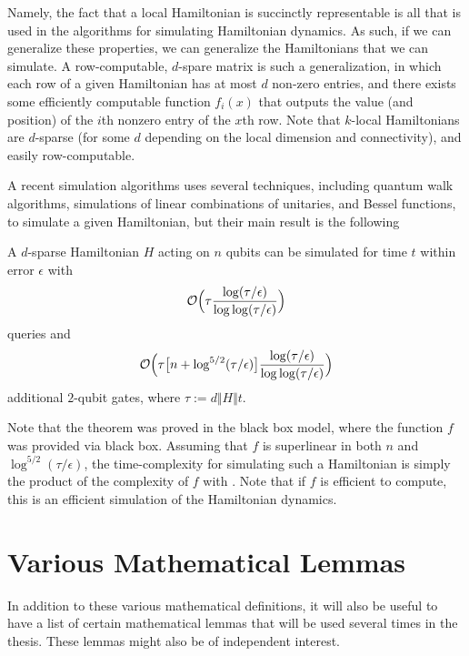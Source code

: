 \documentclass[../thesis-main/thesis-main]{subfiles}
\begin{document}
Namely, the fact that a local Hamiltonian is succinctly representable is all that is used in the algorithms for simulating Hamiltonian dynamics.  As such, if we can generalize these properties, we can generalize the Hamiltonians that we can simulate.  A row-computable, $d$-spare matrix is such a generalization, in which each row of a given Hamiltonian has at most $d$ non-zero entries, and there exists some efficiently computable function $f_{i}(x)$ that outputs the value (and position) of the $i$th nonzero entry of the $x$th row.  Note that $k$-local Hamiltonians are $d$-sparse (for some $d$ depending on the local dimension and connectivity), and easily row-computable.

A recent simulation algorithms \cite{BCK15} uses several techniques, including quantum walk algorithms, simulations of linear combinations of unitaries, and Bessel functions, to simulate a given Hamiltonian, but their main result is the following
\begin{theorem}\label{thm:hamiltonian_simulation}
A $d$-sparse Hamiltonian $H$ acting on $n$ qubits can be simulated for time $t$ within error $\epsilon$ with
\begin{align}
  \mathcal{O}\Big( \tau \frac{ \log (\tau/\epsilon)}{\log\log (\tau/\epsilon)}\Big)
  \label{eq:hamiltonian_query_bound}
\end{align}
queries and 
\begin{align}
  \mathcal{O}\Big( \tau \big[n + \log^{5/2} (\tau/\epsilon) \big] \frac{\log (\tau/\epsilon)}{\log\log(\tau/\epsilon)}\Big)
  \label{eq:hamiltonian_2qubit_bound}
\end{align}
additional $2$-qubit gates, where $\tau := d \Vert H \Vert t$.
\end{theorem}
Note that the theorem was proved in the black box model, where the function $f$ was provided via black box.  Assuming that $f$ is superlinear in both $n$ and $\log^{5/2}(\tau/\epsilon)$, the time-complexity for simulating such a Hamiltonian is simply the product of the complexity of $f$ with .  Note that if $f$ is efficient to compute, this is an efficient simulation of the Hamiltonian dynamics.

\section{Various Mathematical Lemmas}

In addition to these various mathematical definitions, it will also be useful to have a list of certain mathematical lemmas that will be used several times in the thesis.  These lemmas might also be of independent interest.
\end{document}
